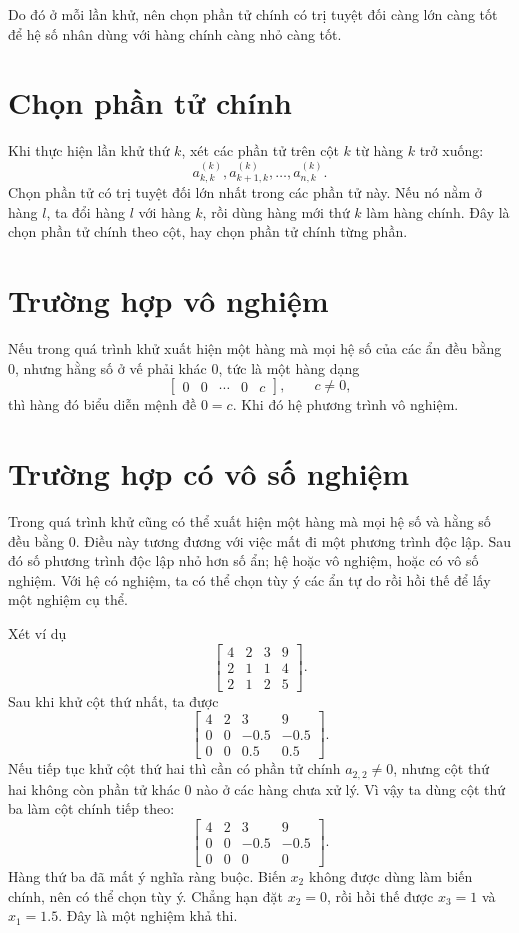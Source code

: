 \documentclass[11pt]{article}
\begin{document}
Do đó ở mỗi lần khử, nên chọn phần tử chính có trị tuyệt đối càng lớn càng tốt
để hệ số nhân dùng với hàng chính càng nhỏ càng tốt.

\section{Chọn phần tử chính}

Khi thực hiện lần khử thứ \(k\), xét các phần tử trên cột \(k\) từ hàng \(k\)
trở xuống:
\[
  a_{k,k}^{(k)},a_{k+1,k}^{(k)},\ldots,a_{n,k}^{(k)}.
\]
Chọn phần tử có trị tuyệt đối lớn nhất trong các phần tử này. Nếu nó nằm ở
hàng \(l\), ta đổi hàng \(l\) với hàng \(k\), rồi dùng hàng mới thứ \(k\) làm
hàng chính. Đây là chọn phần tử chính theo cột, hay chọn phần tử chính từng
phần.

\section{Trường hợp vô nghiệm}

Nếu trong quá trình khử xuất hiện một hàng mà mọi hệ số của các ẩn đều bằng
\(0\), nhưng hằng số ở vế phải khác \(0\), tức là một hàng dạng
\[
  \left[\begin{array}{cccc|c}
  0 & 0 & \cdots & 0 & c
  \end{array}\right],
  \qquad c\ne 0,
\]
thì hàng đó biểu diễn mệnh đề \(0=c\). Khi đó hệ phương trình vô nghiệm.

\section{Trường hợp có vô số nghiệm}

Trong quá trình khử cũng có thể xuất hiện một hàng mà mọi hệ số và hằng số đều
bằng \(0\). Điều này tương đương với việc mất đi một phương trình độc lập.
Sau đó số phương trình độc lập nhỏ hơn số ẩn; hệ hoặc vô nghiệm, hoặc có vô
số nghiệm. Với hệ có nghiệm, ta có thể chọn tùy ý các ẩn tự do rồi hồi thế để
lấy một nghiệm cụ thể.

Xét ví dụ
\[
\left[
\begin{array}{rrr|r}
4 & 2 & 3 & 9\\
2 & 1 & 1 & 4\\
2 & 1 & 2 & 5
\end{array}
\right].
\]
Sau khi khử cột thứ nhất, ta được
\[
\left[
\begin{array}{rrr|r}
4 & 2 & 3 & 9\\
0 & 0 & -0.5 & -0.5\\
0 & 0 & 0.5 & 0.5
\end{array}
\right].
\]
Nếu tiếp tục khử cột thứ hai thì cần có phần tử chính \(a_{2,2}\ne 0\), nhưng
cột thứ hai không còn phần tử khác \(0\) nào ở các hàng chưa xử lý. Vì vậy ta
dùng cột thứ ba làm cột chính tiếp theo:
\[
\left[
\begin{array}{rrr|r}
4 & 2 & 3 & 9\\
0 & 0 & -0.5 & -0.5\\
0 & 0 & 0 & 0
\end{array}
\right].
\]
Hàng thứ ba đã mất ý nghĩa ràng buộc. Biến \(x_2\) không được dùng làm biến
chính, nên có thể chọn tùy ý. Chẳng hạn đặt \(x_2=0\), rồi hồi thế được
\(x_3=1\) và \(x_1=1.5\). Đây là một nghiệm khả thi.
\end{document}
